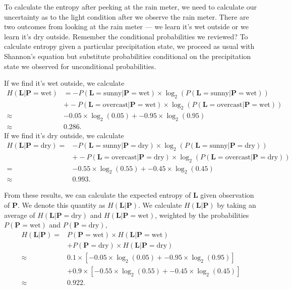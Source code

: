 To calculate the entropy after peeking at the rain meter, we need to calculate our uncertainty as to the light condition after we observe the rain meter.
There are two outcomes from looking at the rain meter --- we learn it's wet outside or we learn it's dry outside.
Remember the conditional probabilities we reviewed?
To calculate entropy given a particular precipitation state, we proceed as usual with Shannon's equation but substitute probabilities conditional on the precipitation state we observed for unconditional probabilities.

If we find it's wet outside, we calculate
\begin{align*}
H(\bm{L} | \bm{P} = \text{wet})
&=
- P(\bm{L} = \text{sunny} | \bm{P} = \text{wet}) \times \log_2(P(\bm{L} = \text{sunny} | \bm{P} = \text{wet})) \\
&+ - P(\bm{L} = \text{overcast} | \bm{P} = \text{wet}) \times \log_2(P(\bm{L} = \text{overcast} | \bm{P} = \text{wet})) \\
\approx&
- 0.05 \times \log_2(0.05) + - 0.95 \times \log_2(0.95) \\
\approx& 0.286.
\end{align*}
If we find it's dry outside, we calculate
\begin{align*}
H(\bm{L} | \bm{P} = \text{dry})
=&
- P(\bm{L} = \text{sunny} | \bm{P} = \text{dry}) \times \log_2(P(\bm{L} = \text{sunny} | \bm{P} = \text{dry})) \\
&+  - P(\bm{L} = \text{overcast} | \bm{P} = \text{dry}) \times \log_2(P(\bm{L} = \text{overcast} | \bm{P} = \text{dry})) \\
=&
- 0.55 \times \log_2(0.55) + - 0.45 \times \log_2(0.45) \\
\approx& 0.993.
\end{align*}

From these results, we can calculate the expected entropy of $\bm{L}$ given observation of $\bm{P}$.
We denote this quantity as $H(\bm{L}|\bm{P})$.
We calculate $H(\bm{L}|\bm{P})$ by taking an average of $H(\bm{L} | \bm{P} = \text{dry})$ and $H(\bm{L} | \bm{P} = \text{wet})$, weighted by the probabilities $P(\bm{P} = \text{wet})$ and $P(\bm{P} = \text{dry})$,
\begin{align*}
H(\bm{L} | \bm{P})
=&
P(\bm{P} = \text{wet}) \times H(\bm{L} | \bm{P} = \text{wet}) \\
&+ P(\bm{P} = \text{dry}) \times H(\bm{L} | \bm{P} = \text{dry}) \\
\approx& 0.1 \times [ - 0.05 \times \log_2(0.05) + - 0.95 \times \log_2(0.95) ] \\
&+ 0.9 \times [ - 0.55 \times \log_2(0.55) + - 0.45 \times \log_2(0.45) ] \\
\approx& 0.922.
\end{align*}

